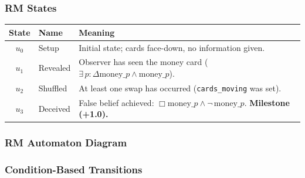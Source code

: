 \documentclass[11pt]{article}
\newcommand{\EBel}[1]{\ensuremath{\Delta #1}} %
\newcommand{\IBel}[1]{\ensuremath{\Box #1}}   %
\begin{document}
\subsubsection{RM States}

\begin{center}
\begin{tabular}{cll}
\toprule
\textbf{State} & \textbf{Name} & \textbf{Meaning} \\
\midrule
$u_0$ & Setup & Initial state; cards face-down, no information given. \\
$u_1$ & Revealed & Observer has seen the money card ($\exists\, p: \EBel{\text{money}\_p} \land \text{money}\_p$). \\
$u_2$ & Shuffled & At least one swap has occurred (\texttt{cards\_moving} was set). \\
$u_3$ & Deceived & False belief achieved: $\IBel{\text{money}\_p} \land \neg\,\text{money}\_p$. \textbf{Milestone (+1.0).} \\
\bottomrule
\end{tabular}
\end{center}

\subsubsection{RM Automaton Diagram}

\begin{center}
\end{center}

\subsubsection{Condition-Based Transitions}
\end{document}

